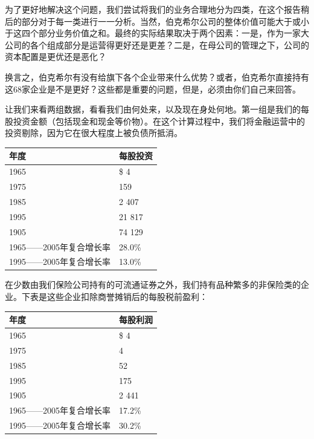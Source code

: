 \documentclass[UTF8,a4paper,zihao=-4,fontset = windows]{ctexart} %
\begin{document}
为了更好地解决这个问题，我们尝试将我们的业务合理地分为四类，在这个报告稍后的部分对于每一类进行一一分析。当然，伯克希尔公司的整体价值可能大于或小于这四个部分业务价值之和。最终的实际结果取决于两个因素：一是，作为一家大公司的各个组成部分是运营得更好还是更差？二是，在母公司的管理之下，公司的资本配置是更优还是恶化？

换言之，伯克希尔有没有给旗下各个企业带来什么优势？或者，伯克希尔直接持有这68家企业是不是更好？这些都是重要的问题，但是，必须由你们自己来回答。

让我们来看两组数据，看看我们由何处来，以及现在身处何地。第一组是我们的每股投资金额（包括现金和现金等价物）。在这个计算过程中，我们将金融运营中的投资剔除，因为它在很大程度上被负债所抵消。

\setlength{\tabcolsep}{7mm}
\begin{tabular}{ll}
    \hline
    \textbf{年度} & \textbf{每股投资}      \\
    \hline
    1965                          & \$ 4 \\
    1975                          & 159   \\
    1985                          & 2 407   \\
    1995                          & 21 817   \\
    1905                          & 74 129   \\
    1965——2005年复合增长率          & 28.0\%  \\
    1995——2005年复合增长率          & 13.0\%  \\
    \hline
    \end{tabular}

在少数由我们保险公司持有的可流通证券之外，我们持有品种繁多的非保险类的企业。下表是这些企业扣除商誉摊销后的每股税前盈利：

\setlength{\tabcolsep}{7mm}
\begin{tabular}{ll}
    \hline
    \textbf{年度} & \textbf{每股利润}      \\
    \hline
    1965                          & \$ 4 \\
    1975                          & 4   \\
    1985                          & 52   \\
    1995                          & 175   \\
    1905                          & 2 441   \\
    1965——2005年复合增长率          & 17.2\%  \\
    1995——2005年复合增长率          & 30.2\%  \\
    \hline
    \end{tabular}
\end{document}
